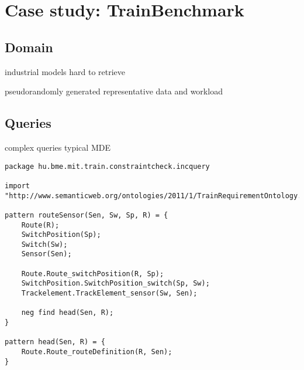 \section{Case study: TrainBenchmark}
\label{sec:trainbenchmark}

\subsection{Domain}

industrial models hard to retrieve

pseudorandomly generated representative data and workload




\subsection{Queries}

complex queries typical MDE


\begin{lstlisting}[caption=The RouteSensor query in IQPL, label=lst:routesensor-iqpl]
package hu.bme.mit.train.constraintcheck.incquery

import "http://www.semanticweb.org/ontologies/2011/1/TrainRequirementOntology.owl" 

pattern routeSensor(Sen, Sw, Sp, R) = {
	Route(R);
	SwitchPosition(Sp);
	Switch(Sw);
	Sensor(Sen);
	
	Route.Route_switchPosition(R, Sp);
	SwitchPosition.SwitchPosition_switch(Sp, Sw);
	Trackelement.TrackElement_sensor(Sw, Sen);
	
	neg find head(Sen, R);	
}

pattern head(Sen, R) = {
	Route.Route_routeDefinition(R, Sen);
}
\end{lstlisting}





% 
% 
% 
